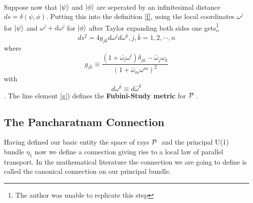  \paragraph{}
Suppose now that $\psiket$ and $\phiket$ are seperated by an infinitesimal distance $ds = \delta(\psi, \phi)$.
Putting this into the definition \ref{f}, using the local coordinates $\omega^j$ for $\psiket$ and $\omega^{j} + d\omega^{j}$
for $\phiket$ after Taylor expanding both sides one gets\footnote{The author was unable to replicate this step} 
\begin{equation}\label{g}
 ds^2 = 4g_{j\bar{k}}d\omega^j d\omega^{\bar{k}}, j,\bar{k} = 1,2,\cdots, n
\end{equation}
  where 
\begin{equation}\label{h}
 g_{j\bar{k}} \equiv \dfrac{(1+ \bar{\omega_{l}}\omega^l)\delta_{jk} - \bar{\omega}_{j} \omega_{k}}{(1 + \bar{\omega}
_{m} \omega^{m})^{2}}
\end{equation}
with 
$$d \omega^{\bar{k}} \equiv d \bar{\omega}^k$$. The line element \ref{g}) defines the \textbf{Fubini-Study metric} for 
$\P\;$.
\subsection{The Pancharatnam Connection}
Having defined our basic entity the space of rays $\P\;$ and the principal U(1) bundle $\eta_1$ now we define a 
connection giving rise to a local law of parallel transport. In the mathematical literature the connection we are 
going to define is called the canonical connection on our principal bundle.
